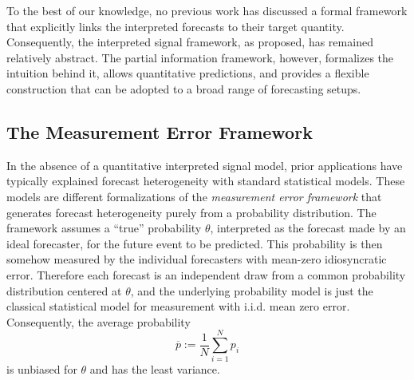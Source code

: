 \documentclass[12pt]{article}
\theoremstyle{definition}
\theoremstyle{definition}
\def\pb{\overline{p}}
\begin{document}


To the best of our knowledge, no previous work has discussed a formal framework that explicitly links the interpreted forecasts to their target quantity. Consequently, the interpreted signal framework, as proposed, has remained relatively abstract. 
The partial information framework, however, formalizes the intuition behind it, allows quantitative predictions, and provides a flexible construction that can be adopted to a broad range of forecasting setups. 

%

\subsection{The Measurement Error Framework}
\label{ss:measurement}
In the absence of a quantitative
interpreted signal model, prior applications have typically explained forecast heterogeneity  with standard statistical models. These models are different formalizations of  the \textit{measurement error framework} that generates forecast heterogeneity purely from a probability distribution. The framework assumes a ``true'' probability
$\theta$, interpreted as the forecast made by an ideal forecaster, for the future event to be predicted. This probability is then somehow measured by the individual forecasters with mean-zero idiosyncratic error.  Therefore each forecast is an independent draw from a common
probability distribution centered at $\theta$, and the underlying probability model is just the classical statistical model for measurement with i.i.d. mean zero error.  
Consequently, the average probability $$\pb :=  \frac{1}{N} \sum_{i=1}^N
p_i $$ is unbiased for $\theta$ and has the least
variance. 
\end{document}
